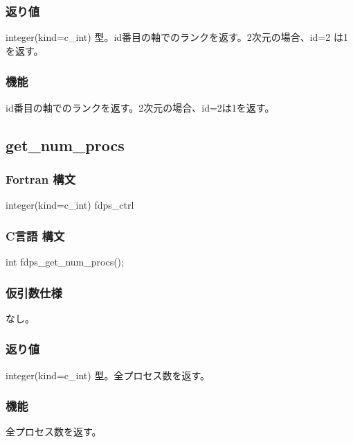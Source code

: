 \subsubsection*{返り値}
integer(kind=c\_int) 型。id番目の軸でのランクを返す。2次元の場合、id=2
は1を返す。

\subsubsection*{機能}
id番目の軸でのランクを返す。2次元の場合、id=2は1を返す。
\clearpage

\subsection{get\_num\_procs}
\subsubsection*{Fortran 構文}
\begin{screen}
\begin{spverbatim}
integer(kind=c_int) fdps_ctrl%
\end{spverbatim}
\end{screen}

\subsubsection*{C言語 構文}
\begin{screen}
\begin{spverbatim}
int fdps_get_num_procs();
\end{spverbatim}
\end{screen}

\subsubsection*{仮引数仕様}
なし。

\subsubsection*{返り値}
integer(kind=c\_int) 型。全プロセス数を返す。

\subsubsection*{機能}
全プロセス数を返す。
\clearpage

